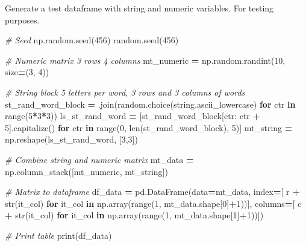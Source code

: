 \documentclass[
]{book}
\newenvironment{Shaded}{\begin{snugshade}}{\end{snugshade}}
\newcommand{\BuiltInTok}[1]{#1}
\newcommand{\CommentTok}[1]{\textcolor[rgb]{0.56,0.35,0.01}{\textit{#1}}}
\newcommand{\ControlFlowTok}[1]{\textcolor[rgb]{0.13,0.29,0.53}{\textbf{#1}}}
\newcommand{\DecValTok}[1]{\textcolor[rgb]{0.00,0.00,0.81}{#1}}
\newcommand{\KeywordTok}[1]{\textcolor[rgb]{0.13,0.29,0.53}{\textbf{#1}}}
\newcommand{\NormalTok}[1]{#1}
\newcommand{\OperatorTok}[1]{\textcolor[rgb]{0.81,0.36,0.00}{\textbf{#1}}}
\newcommand{\StringTok}[1]{\textcolor[rgb]{0.31,0.60,0.02}{#1}}
\begin{document}
Generate a test dataframe with string and numeric variables. For testing purposes.

\begin{Shaded}
\begin{Highlighting}[]
\CommentTok{\# Seed}
\NormalTok{np.random.seed(}\DecValTok{456}\NormalTok{)}
\NormalTok{random.seed(}\DecValTok{456}\NormalTok{)}

\CommentTok{\# Numeric matrix 3 rows 4 columns}
\NormalTok{mt\_numeric }\OperatorTok{=}\NormalTok{ np.random.randint(}\DecValTok{10}\NormalTok{, size}\OperatorTok{=}\NormalTok{(}\DecValTok{3}\NormalTok{, }\DecValTok{4}\NormalTok{))}

\CommentTok{\# String block 5 letters per word, 3 rows and 3 columns of words}
\NormalTok{st\_rand\_word\_block }\OperatorTok{=} \StringTok{\textquotesingle{}\textquotesingle{}}\NormalTok{.join(random.choice(string.ascii\_lowercase) }\ControlFlowTok{for}\NormalTok{ ctr }\KeywordTok{in} \BuiltInTok{range}\NormalTok{(}\DecValTok{5}\OperatorTok{*}\DecValTok{3}\OperatorTok{*}\DecValTok{3}\NormalTok{))}
\NormalTok{ls\_st\_rand\_word }\OperatorTok{=}\NormalTok{ [st\_rand\_word\_block[ctr: ctr }\OperatorTok{+} \DecValTok{5}\NormalTok{].capitalize() }\ControlFlowTok{for}\NormalTok{ ctr }\KeywordTok{in} \BuiltInTok{range}\NormalTok{(}\DecValTok{0}\NormalTok{, }\BuiltInTok{len}\NormalTok{(st\_rand\_word\_block), }\DecValTok{5}\NormalTok{)]}
\NormalTok{mt\_string }\OperatorTok{=}\NormalTok{ np.reshape(ls\_st\_rand\_word, [}\DecValTok{3}\NormalTok{,}\DecValTok{3}\NormalTok{])}

\CommentTok{\# Combine string and numeric matrix}
\NormalTok{mt\_data }\OperatorTok{=}\NormalTok{ np.column\_stack([mt\_numeric, mt\_string])}

\CommentTok{\# Matrix to dataframe}
\NormalTok{df\_data }\OperatorTok{=}\NormalTok{ pd.DataFrame(data}\OperatorTok{=}\NormalTok{mt\_data,}
\NormalTok{                       index}\OperatorTok{=}\NormalTok{[ }\StringTok{\textquotesingle{}r\textquotesingle{}} \OperatorTok{+} \BuiltInTok{str}\NormalTok{(it\_col) }\ControlFlowTok{for}\NormalTok{ it\_col }\KeywordTok{in}\NormalTok{ np.array(}\BuiltInTok{range}\NormalTok{(}\DecValTok{1}\NormalTok{, mt\_data.shape[}\DecValTok{0}\NormalTok{]}\OperatorTok{+}\DecValTok{1}\NormalTok{))],}
\NormalTok{                       columns}\OperatorTok{=}\NormalTok{[ }\StringTok{\textquotesingle{}c\textquotesingle{}} \OperatorTok{+} \BuiltInTok{str}\NormalTok{(it\_col) }\ControlFlowTok{for}\NormalTok{ it\_col }\KeywordTok{in}\NormalTok{ np.array(}\BuiltInTok{range}\NormalTok{(}\DecValTok{1}\NormalTok{, mt\_data.shape[}\DecValTok{1}\NormalTok{]}\OperatorTok{+}\DecValTok{1}\NormalTok{))])}
            
\CommentTok{\# Print table}
\BuiltInTok{print}\NormalTok{(df\_data)}
\end{Highlighting}
\end{Shaded}
\end{document}
